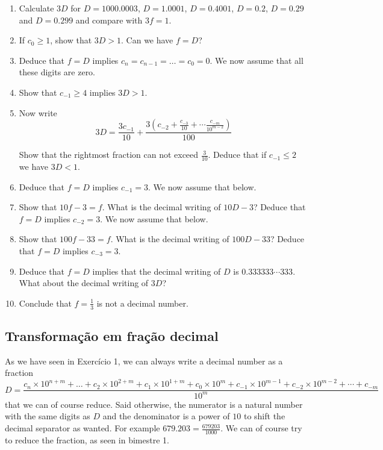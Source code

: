\begin{enumerate}
\item Calculate $3D$ for $D=1000.0003$, $D=1.0001$, $D=0.4001$,
  $D=0.2$, $D=0.29$ and $D=0.299$ and compare with $3f = 1$.
\item If $c_0 \geq 1$, show that $3D > 1$. Can we have $f = D$?
\item Deduce that $f=D$ implies $c_n = c_{n-1} = \ldots = c_{0} = 0$. We now assume
  that all these digits are zero.
\item Show that $c_{-1} \geq 4$ implies $3D > 1$.
\item Now write
  $$3D = \frac{3 c_{-1}}{10} +
  \frac{3 \left(c_{-2} + \frac{c_{-3}}{10} + \cdots \frac{c_{-m}}{10^{m-2}}\right)}{100}
  $$

  Show that the rightmost fraction can not exceed $\frac{3}{10}$. Deduce
  that if $c_{-1} \leq 2$ we have $3D < 1$.

\item Deduce that $f=D$ implies $c_{-1}=3$. We now assume that below.

\item Show that $10f - 3 = f$. What is the decimal writing of $10D - 3$?
  Deduce that $f=D$ implies $c_{-2} = 3$. We now assume that below.

\item Show that $100f - 33 = f$. What is the decimal writing of $100D - 33$?
  Deduce that $f=D$ implies $c_{-3} = 3$.

\item Deduce that $f=D$ implies that the decimal writing of
  $D$ is $0.333333 \cdots 333$. What about the decimal writing of $3D$?

\item Conclude that $f = \frac{1}{3}$ is not a decimal number.

\end{enumerate}

\subsection*{Transformação em fração decimal}

As we have seen in Exercício 1, we can always write a decimal number as a
fraction
$$D=
\frac{{c_n \times 10^{n+m}} + \dots + {c_2 \times 10^{2+m}} + {c_1 \times 10^{1+m}} + {c_0 \times 10^m} +
{c_{-1} \times 10^{m-1}} +
{c_{-2} \times 10^{m-2}} + \cdots +
{c_{-m}}}{10^{m}}
$$
that we can of course reduce. Said otherwise, the numerator is a natural number
with the same digits as $D$ and the denominator is a power of $10$ to shift
the decimal separator as wanted.
For example $679.203=\frac{679203}{1000}$. We can of course try to reduce the
fraction, as seen in bimestre 1.

